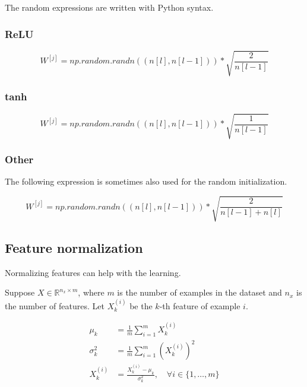 	The random expressions are written with Python syntax.
	
	\subsubsection{ReLU}
	\[
		W^{[j]} = np.random.randn((n[l],n[l-1])) * \sqrt{\frac{2}{n[l-1]}}
	\]
	
	\subsubsection{tanh}
	\[
		W^{[j]} = np.random.randn((n[l],n[l-1])) * \sqrt{\frac{1}{n[l-1]}}
	\]
	
	\subsubsection{Other}
	The following expression is sometimes also used for the random initialization.
	
	\[
		W^{[j]} = np.random.randn((n[l],n[l-1])) * \sqrt{\frac{2}{n[l-1] + n[l]}}
	\]
	
\subsection{Feature normalization}
	Normalizing features can help with the learning.
	
	Suppose $X\in\mathbb{R}^{n_x\times m}$, where $m$ is the number of examples in the dataset and $n_x$
	is the number of features.
	Let $X^{(i)}_k$ be the $k$-th feature of example $i$.
	
	\begin{align}
		\mu_k				&= \frac{1}{m} \sum_{i=1}^{m} X^{(i)}_k \\
		\sigma^2_k		&= \frac{1}{m} \sum_{i=1}^{m} (X^{(i)}_k)^2 \\
		X^{(i)}_k 			&= \frac{X^{(i)}_k - \mu_k}{\sigma_k^2}, \quad\forall i\in\{1,\dots,m\}
	\end{align}